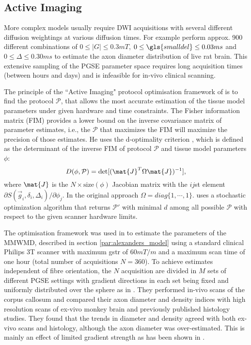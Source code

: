 \subsection{Active Imaging}
\label{sec:protocol_optimisation}
More complex models usually require  {\gls{DWI}}  acquisitions with several different diffusion weightings at various diffusion times. For example \citet{Barazany:2009} perform approx. 900 different combinations of $0\le|G|\le 0.3mT$, $0\le {\gls{smalldel}} \le 0.03ms$ and $0\le \Delta \le 0.30ms$ to estimate the axon diameter distribution of live rat brain. This extensive sampling of the \gls{PGSE} parameter space requires long acquisition times (between hours and days) and is infeasible for in-vivo clinical scanning. 

The principle of the ``Active Imaging" protocol optimisation framework of \cite{Alexander:2008} is to find the protocol $\mathcal{P}$, that allows the most accurate estimation of the tissue model parameters under given hardware and time constraints. The Fisher information matrix (FIM) provides a lower bound on the inverse covariance matrix of parameter estimates, i.e., the $\mathcal{P}$ that maximizes the FIM will maximize the precision of those estimates. He uses the d-optimality criterion \citep{OBrien:2003}, which is defined as the determinant of the inverse FIM of protocol $\mathcal{P}$ and tissue model parameters $\phi$:
\begin{equation}
	D(\phi,\mathcal{P})=\det[(\mat{J}^T\Omega\mat{J})^{-1}], 
	\label{eq-optimality}
\end{equation}
where $\mat{J}$ is the $N\times \mbox{size}(\phi)$ Jacobian matrix with the $ij$st element $\partial S(\vec{g}_i,\delta_i,\Delta_i) / \partial \phi_j$. In the original approach $\Omega=diag\{1,\cdots,1\}$. \citet{Alexander:2008} uses a stochastic optimization algorithm \citep{Zelinka:2010} that returns $\mathcal{P}'$ with minimal $d$ among all possible $\mathcal{P}$ with respect to the given scanner hardware limits.

The optimisation framework was used in \citet{Alexander:2010} to estimate the parameters of the \gls{MMWMD}, described in section \ref{par:alexanders_model} using a standard clinical Philips 3T scanner with maximum {\gls{gstr}} of $60mT/m$ and a maximum scan time of one hour (total number of acquisitions $N=360$). To achieve estimates independent of fibre orientation, the $N$ acquisition are divided in $M$ sets of different PGSE settings with gradient directions in each set being fixed and uniformly distributed over the sphere as in \cite{Jones:2004a}. They performed in-vivo scans of the corpus callosum and compared their axon diameter and density indices with high resolution scans of ex-vivo monkey brain and previously published histology studies. They found that the trends in diameter and density agreed with both ex-vivo scans and histology, although the axon diameter was over-estimated. This is mainly an effect of limited gradient strength as has been shown in \cite{Dyrby:2010}.  


